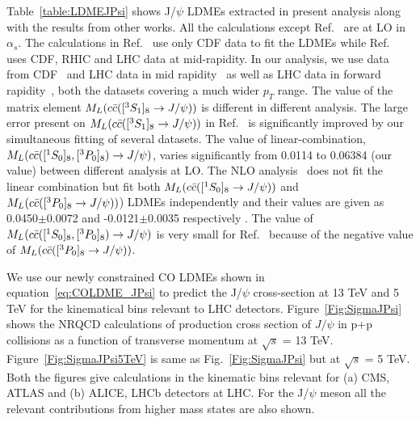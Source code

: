 \documentclass[aps,prc,preprint,superscriptaddress,showpacs,showkeys,amsmath]{revtex4-1}
\begin{document}
Table~\ref{table:LDMEJPsi} shows J/$\psi$ LDMEs extracted in present analysis along with the results from other 
works. All the calculations except Ref.~\cite{Butenschoen:2010rq} are at LO in $\alpha_{s}$. 
The calculations in Ref.~\cite{Cho:1995vh,Braaten:1999qk,Beneke:1996yw} 
use only CDF data to fit the LDMEs while Ref.~\cite{Sharma:2012dy} uses CDF, RHIC and LHC data at mid-rapidity. 
In our analysis, we use data from CDF~\cite{Abe:1997jz,Acosta:2004yw} and LHC data in mid rapidity~\cite{Chatrchyan:2011kc,Khachatryan:2015rra,Aad:2015duc} 
as well as LHC data in forward rapidity~\cite{Aaij:2011jh,Aaij:2015rla}, both the datasets covering a much wider $p_T$ range.
The value of the matrix element $M_{L}(c{\bar{c}}([^3S_1]_{8}\rightarrow J/\psi))$ is different in different analysis.
The large error present on $M_{L}(c{\bar{c}}([^3S_1]_{8}\rightarrow J/\psi))$ in Ref.~\cite{Sharma:2012dy} is significantly improved by our 
simultaneous fitting of several datasets. The value of linear-combination, 
$M_{L}(c{\bar{c}}([^1S_0]_{8},[^3P_0]_{8})\rightarrow J/\psi)$, varies significantly from 0.0114 to 
0.06384 (our value) between different analysis at LO. The NLO analysis~\cite{Butenschoen:2010rq} does not fit the linear combination but
fit both $M_{L}(c{\bar{c}}([^1S_0]_{8}\rightarrow J/\psi))$ and $M_{L}(c{\bar{c}}([^3P_0]_{8}\rightarrow J/\psi))$) 
LDMEs independently and their values are given as 0.0450$\pm$0.0072 and -0.0121$\pm$0.0035 respectively . The value of $M_{L}(c{\bar{c}}([^1S_0]_{8},[^3P_0]_{8})\rightarrow J/\psi)$
is very small for Ref.~\cite{Butenschoen:2010rq} because of the negative value of $M_{L}(c{\bar{c}}([^3P_0]_{8}\rightarrow J/\psi))$.     

 




 We use our newly constrained CO LDMEs shown in equation~\ref{eq:COLDME_JPsi} to 
predict the J/$\psi$ cross-section at 13 TeV and 5 TeV for the kinematical 
bins relevant to LHC detectors.     
  Figure~\ref{Fig:SigmaJPsi} shows the NRQCD 
calculations of production cross section of $J/\psi$ in p+p collisions  
as a function of transverse momentum at $\sqrt{s}$ = 13 TeV. 
Figure~\ref{Fig:SigmaJPsi5TeV} is same as Fig.~\ref{Fig:SigmaJPsi} but at 
$\sqrt{s}$ = 5 TeV. 
 Both the figures give calculations in the kinematic bins relevant for (a) CMS, ATLAS and 
(b) ALICE, LHCb detectors at LHC. For the J/$\psi$ meson all the relevant contributions 
from higher mass states are also shown. 
\end{document}
